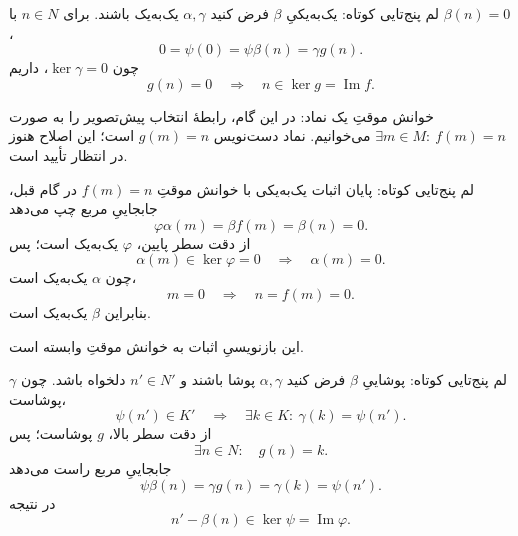 \begin{frame}[t]{لم پنج‌تایی کوتاه: یک‌به‌یکیِ \(\beta\)}
    \label{lec16:five-injective-preimage}
    فرض کنید \(\alpha,\gamma\) یک‌به‌یک باشند. برای \(n\in N\) با \(\beta(n)=0\)،
    \[
        0=\psi(0)=\psi\beta(n)=\gamma g(n).
    \]
    چون \(\ker\gamma=0\)، داریم
    \[
        g(n)=0\quad\Longrightarrow\quad n\in\ker g=\operatorname{Im}f.
    \]
    \begin{alertblock}{خوانش موقتِ یک نماد: }
        در این گام، رابطهٔ انتخاب پیش‌تصویر را به صورت
        \(\exists m\in M:\ f(m)=n\) می‌خوانیم.
        نماد دست‌نویس \(g(m)=n\) است؛ این اصلاح هنوز در انتظار تأیید است.
    \end{alertblock}
\end{frame}

\begin{frame}[t]{لم پنج‌تایی کوتاه: پایان اثبات یک‌به‌یکی}
    \label{lec16:five-injective-end}
    با خوانش موقتِ \(f(m)=n\) در گام قبل، جابجاییِ مربع چپ می‌دهد
    \[
        \varphi\alpha(m)=\beta f(m)=\beta(n)=0.
    \]
    از دقت سطر پایین، \(\varphi\) یک‌به‌یک است؛ پس
    \[
        \alpha(m)\in\ker\varphi=0\quad\Longrightarrow\quad\alpha(m)=0.
    \]
    چون \(\alpha\) یک‌به‌یک است،
    \[
        m=0\quad\Longrightarrow\quad n=f(m)=0.
    \]
    بنابراین \(\beta\) یک‌به‌یک است.
    \medskip

    \alert{این بازنویسیِ اثبات به خوانش موقتِ  وابسته است.}
\end{frame}

\begin{frame}[t]{لم پنج‌تایی کوتاه: پوشاییِ \(\beta\)}
    \label{lec16:five-surjective-choices}
    فرض کنید \(\alpha,\gamma\) پوشا باشند و \(n'\in N'\) دلخواه باشد.
    چون \(\gamma\) پوشاست،
    \[
        \psi(n')\in K'\quad\Longrightarrow\quad
        \exists k\in K:\ \gamma(k)=\psi(n').
    \]
    از دقت سطر بالا، \(g\) پوشاست؛ پس
    \[
        \exists n\in N:\quad g(n)=k.
    \]
    جابجاییِ مربع راست می‌دهد
    \[
        \psi\beta(n)=\gamma g(n)=\gamma(k)=\psi(n').
    \]
    در نتیجه
    \[
        n'-\beta(n)\in\ker\psi=\operatorname{Im}\varphi.
    \]
\end{frame}

